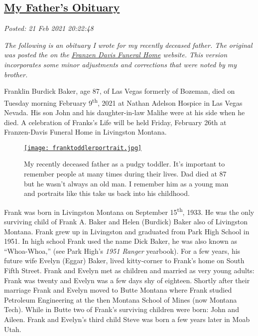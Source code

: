 %

\subsection*{\href{http://analyzethedatanotthedrivel.org/2021/02/21/my-fathers-obituary/}{My Father's Obituary}}


\noindent\emph{Posted: 21 Feb 2021 20:22:48}
\vspace{6pt}

\emph{The following is an obituary I wrote for my recently deceased
father. The original was posted the on the
\href{https://www.franzen-davis.com/obituaries/Franklin-Burdick-Baker?obId=19950108}{Franzen
Davis Funeral Home} website. This version incorporates some minor
adjustments and corrections that were noted by my brother.}

\medskip

Franklin Burdick Baker, age 87, of Las Vegas formerly of Bozeman, died
on Tuesday morning February 9\textsuperscript{th}, 2021 at Nathan
Adelson Hospice in Las Vegas Nevada. His son John and his
daughter-in-law Malihe were at his side when he died. A celebration of
Franks's Life will be held Friday, February 26th at Franzen-Davis
Funeral Home in Livingston Montana.

\captionsetup[figure]{labelformat=empty}
\begin{SCfigure}[50]
\centering
\href{https://conceptcontrol.smugmug.com/People/The-Way-We-Were/i-KZxPpwz/A}{\texttt{[image: franktoddlerportrait.jpg]}}
\caption{My recently deceased father as a pudgy toddler. It's important
to remember people at many times during their lives. Dad died at 87 but
he wasn't always an old man. I remember him as a young man and portraits
like this take us back into his childhood.}
\label{fig:7074x0}
\end{SCfigure}

Frank was born in Livingston Montana on September
15\textsuperscript{th}, 1933. He was the only surviving child of Frank
A. Baker and Helen (Burdick) Baker also of Livingston Montana. Frank
grew up in Livingston and graduated from Park High School in 1951. In
high school Frank used the name Dick Baker, he was also known as
``Whoa-Whoa,'' (see Park High's \emph{1951 Ranger} yearbook). For a few
years, his future wife Evelyn (Eggar) Baker, lived kitty-corner to
Frank's home on South Fifth Street. Frank and Evelyn met as children and
married as very young adults: Frank was twenty and Evelyn was a few days
shy of eighteen. Shortly after their marriage Frank and Evelyn moved to
Butte Montana where Frank studied Petroleum Engineering at the then
Montana School of Mines (now Montana Tech). While in Butte two of
Frank's surviving children were born: John and Aileen. Frank and
Evelyn's third child Steve was born a few years later in Moab Utah.

